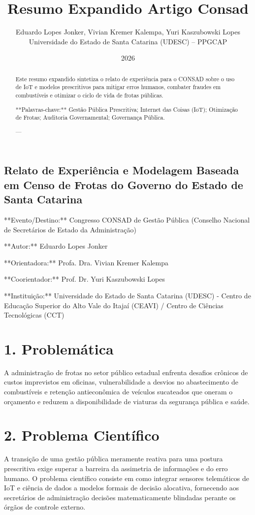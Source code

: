 \documentclass[10pt,a4paper,journal]{article}
\title{Resumo Expandido Artigo Consad}
\author{Eduardo Lopes Jonker, Vivian Kremer Kalempa, Yuri Kaszubowski Lopes\\ \small Universidade do Estado de Santa Catarina (UDESC) -- PPGCAP}
\date{2026}
\begin{document}
\maketitle

\subsection{Relato de Experiência e Modelagem Baseada em Censo de Frotas do Governo do Estado de Santa Catarina}
**Evento/Destino:** Congresso CONSAD de Gestão Pública (Conselho Nacional de Secretários de Estado da Administração)

**Autor:** Eduardo Lopes Jonker

**Orientadora:** Profa. Dra. Vivian Kremer Kalempa

**Coorientador:** Prof. Dr. Yuri Kaszubowski Lopes

**Instituição:** Universidade do Estado de Santa Catarina (UDESC) - Centro de Educação Superior do Alto Vale do Itajaí (CEAVI) / Centro de Ciências Tecnológicas (CCT)

\begin{abstract}
Este resumo expandido sintetiza o relato de experiência para o CONSAD sobre o uso de IoT e modelos prescritivos para mitigar erros humanos, combater fraudes em combustíveis e otimizar o ciclo de vida de frotas públicas.

**Palavras-chave:** Gestão Pública Prescritiva; Internet das Coisas (IoT); Otimização de Frotas; Auditoria Governamental; Governança Pública.

---

\end{abstract}

\section{1. Problemática}
A administração de frotas no setor público estadual enfrenta desafios crônicos de custos imprevistos em oficinas, vulnerabilidade a desvios no abastecimento de combustíveis e retenção antieconômica de veículos sucateados que oneram o orçamento e reduzem a disponibilidade de viaturas da segurança pública e saúde.

\section{2. Problema Científico}
A transição de uma gestão pública meramente reativa para uma postura prescritiva exige superar a barreira da assimetria de informações e do erro humano. O problema científico consiste em como integrar sensores telemáticos de IoT e ciência de dados a modelos formais de decisão alocativa, fornecendo aos secretários de administração decisões matematicamente blindadas perante os órgãos de controle externo.
\end{document}
